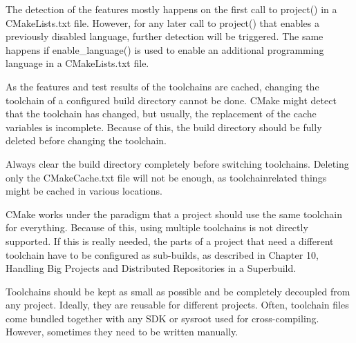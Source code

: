 The detection of the features mostly happens on the first call to project() in a CMakeLists.txt file. However, for any later call to project() that enables a previously disabled language, further detection will be triggered. The same happens if enable\_language() is used to enable an additional programming language in a CMakeLists.txt file.

As the features and test results of the toolchains are cached, changing the toolchain of a configured build directory cannot be done. CMake might detect that the toolchain has changed, but usually, the replacement of the cache variables is incomplete. Because of this, the build directory should be fully deleted before changing the toolchain.

\begin{tcolorbox}[colback=blue!5!white,colframe=blue!75!black,title=Switching Toolchains After Configuring]
Always clear the build directory completely before switching toolchains. Deleting only the CMakeCache.txt file will not be enough, as toolchainrelated things might be cached in various locations.
\end{tcolorbox}

CMake works under the paradigm that a project should use the same toolchain for everything. Because of this, using multiple toolchains is not directly supported. If this is really needed, the parts of a project that need a different toolchain have to be configured as sub-builds, as described in Chapter 10, Handling Big Projects and Distributed Repositories in a Superbuild.

Toolchains should be kept as small as possible and be completely decoupled from any
project. Ideally, they are reusable for different projects. Often, toolchain files come bundled together with any SDK or sysroot used for cross-compiling. However, sometimes they need to be written manually.












